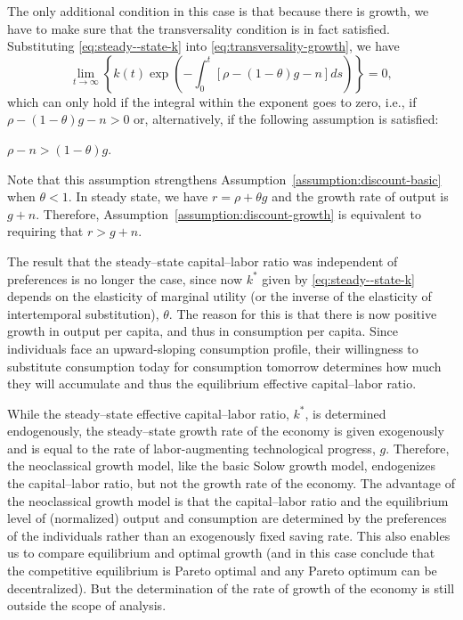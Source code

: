\documentclass[\topdir/lecture\_notes.tex]{subfiles}
\begin{document}
The only additional condition in this case is that because there is growth, we have to make sure that the transversality condition is in fact satisfied. Substituting \eqref{eq:steady--state-k} into \eqref{eq:transversality-growth}, we have
\[
  \lim _{t \rightarrow \infty}\left\{k(t) \exp \left(-\int_{0}^{t}[\rho-(1-\theta) g-n] d s\right)\right\}=0,
\]
which can only hold if the integral within the exponent goes to zero, i.e., if \(\rho-(1-\theta) g-n>0\) or, alternatively, if the following assumption is satisfied:
\begin{assumption}
  \label{assumption:discount-growth}
  \(\rho-n>(1-\theta) g\).
\end{assumption}
Note that this assumption strengthens Assumption~\ref{assumption:discount-basic} when \(\theta<1\). In steady state, we have \(r=\rho+\theta g\) and the growth rate of output is \(g+n\). Therefore, Assumption~\ref{assumption:discount-growth} is equivalent to requiring that \(r>g+n\).

The result that the steady--state capital--labor ratio was independent of preferences is no longer the case, since now \(k^{*}\) given by \eqref{eq:steady--state-k} depends on the elasticity of marginal utility (or the inverse of the elasticity of intertemporal substitution), \(\theta\). The reason for this is that there is now positive growth in output per capita, and thus in consumption per capita. Since individuals face an upward-sloping consumption profile, their willingness to substitute consumption today for consumption tomorrow determines how much they will accumulate and thus the equilibrium effective capital--labor ratio.

While the steady--state effective capital--labor ratio, \(k^{*}\), is determined endogenously, the steady--state growth rate of the economy is given exogenously and is equal to the rate of labor-augmenting technological progress, \(g\). Therefore, the neoclassical growth model, like the basic Solow growth model, endogenizes the capital--labor ratio, but not the growth rate of the economy. The advantage of the neoclassical growth model is that the capital--labor ratio and the equilibrium level of (normalized) output and consumption are determined by the preferences of the individuals rather than an exogenously fixed saving rate. This also enables us to compare equilibrium and optimal growth (and in this case conclude that the competitive equilibrium is Pareto optimal and any Pareto optimum can be decentralized). But the determination of the rate of growth of the economy is still outside the scope of analysis.
\end{document}
